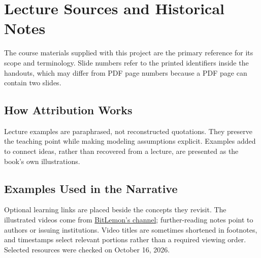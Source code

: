 \chapter{Lecture Sources and Historical Notes}\label{ch:source-notes}
The course materials supplied with this project are the primary reference for its scope and terminology.
Slide numbers refer to the printed identifiers inside the handouts, which may differ from PDF page numbers because a PDF page can contain two slides.

\section*{How Attribution Works}
Lecture examples are paraphrased, not reconstructed quotations.
They preserve the teaching point while making modeling assumptions explicit.
Examples added to connect ideas, rather than recovered from a lecture, are presented as the book's own illustrations.

\section*{Examples Used in the Narrative}
Optional learning links are placed beside the concepts they revisit.
The illustrated videos come from \href{https://www.youtube.com/@BitLemonSoftware}{BitLemon's channel}; further-reading notes point to authors or issuing institutions.
Video titles are sometimes shortened in footnotes, and timestamps select relevant portions rather than a required viewing order.
Selected resources were checked on October 16, 2026.

